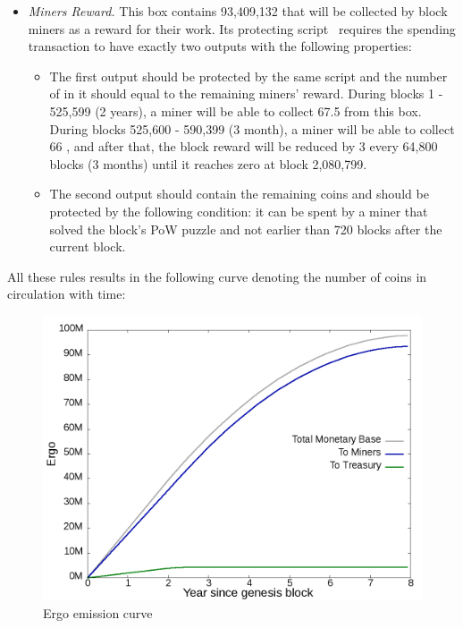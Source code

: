 \begin{itemize}
    \item{\em Miners Reward.} This box contains 93,409,132 \Erg{} that will be collected by block miners
    as a reward for their work.
    Its protecting script~\cite{scriptEmission} requires the spending transaction to have exactly two outputs with the following properties:

    \begin{itemize}
    \item{} The first output should be protected by the same script and the number of \Erg{} in it should
    equal to the remaining miners' reward.
    During blocks 1 - 525,599 (2 years), a miner will be able to collect 67.5 \Erg{} from this box. During blocks 525,600 - 590,399 (3 month), a miner will be able to collect 66 \Erg{}, and after that, the block reward will be reduced by 3 \Erg{} every 64,800 blocks (3 months) until it reaches zero at block 2,080,799.

    \item{} The second output should contain the remaining coins and should be protected by the following condition:
    it can be spent by a miner that solved the block's PoW puzzle and not earlier than 720 blocks after the current block.
    \end{itemize}

\end{itemize}

All these rules results in the following curve denoting the number of coins in circulation with time:

\begin{figure}[H]
    \centering
    \includegraphics[width=\textwidth]{img/emission.png}
    \caption{Ergo emission curve
    \label{fig:emission} }
\end{figure}
